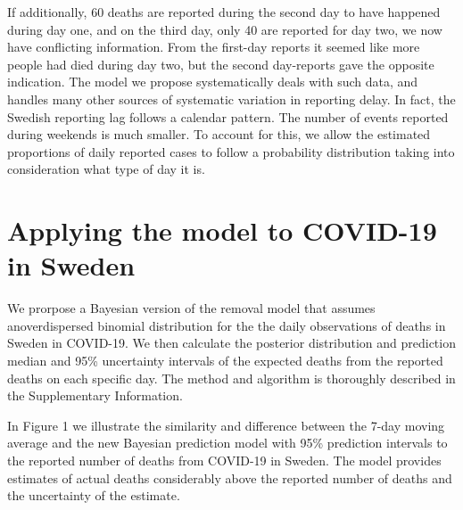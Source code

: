\documentclass[a4paper,11pt,article,oneside,openany,american]{memoir}
\begin{document}
If additionally, 60 deaths are reported during the second day to have happened during day one, and on the third day, only 40 are reported for day two, we now have conflicting information. From the first-day reports it seemed like more people had died during day two, but the second day-reports gave the opposite indication. The model we propose systematically deals with such data, and handles many other sources of systematic variation in reporting delay. In fact, the Swedish reporting lag follows a calendar pattern. The number of events reported during weekends is much smaller. To account for this, we  allow the estimated proportions of daily reported cases to follow a probability distribution taking into consideration what type of day it is.

\chapter{Applying the model to COVID-19 in Sweden}
We prorpose a Bayesian version of the removal model that assumes anoverdispersed binomial distribution for the  the daily observations of deaths in Sweden in COVID-19. We then calculate the posterior distribution and prediction median and 95\% uncertainty intervals of the expected deaths from the reported deaths on each specific day. The method and algorithm is thoroughly described in the Supplementary Information.

In Figure 1 we illustrate the similarity and difference between the 7-day moving average and the new Bayesian prediction model with 95\% prediction intervals to the reported number of deaths from COVID-19 in Sweden. The model provides estimates of actual deaths considerably above the reported number of deaths and the uncertainty of the estimate.




\end{document}
